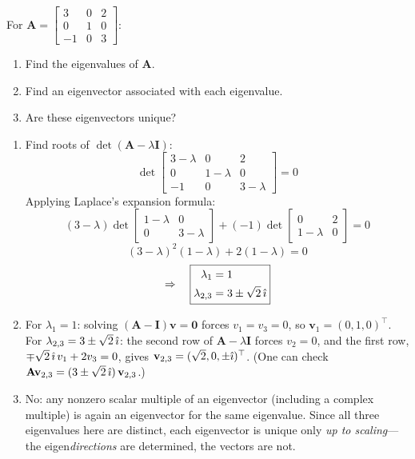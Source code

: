 \begin{exercise} %
    For $\mathbf{A} = \begin{bmatrix} 3 & 0 & 2 \\ 0 & 1 & 0 \\ -1 & 0 & 3 \end{bmatrix}$:
    \begin{enumerate}[label=(\alph*)]
        \item Find the eigenvalues of $\mathbf{A}$.
        \item Find an eigenvector associated with each eigenvalue.
        \item Are these eigenvectors unique?
    \end{enumerate}
\end{exercise}

\begin{solution}
    \begin{enumerate}[label=(\alph*)]
        \item
        Find roots of $\det (\mathbf{A} - \lambda \mathbf{I})$:
        \[
        \det\begin{bmatrix} 3-\lambda & 0 & 2 \\ 0 & 1-\lambda & 0 \\ -1 & 0 & 3-\lambda \end{bmatrix} = 0
        \]
        Applying Laplace's expansion formula:
        \[
        (3-\lambda)\det\begin{bmatrix} 1-\lambda & 0 \\ 0 & 3-\lambda \end{bmatrix} + (-1)\det\begin{bmatrix} 0 & 2 \\ 1-\lambda & 0 \end{bmatrix} = 0
        \]
        \[
        (3-\lambda)^2(1-\lambda) + 2(1-\lambda) = 0
        \]
        \[
            \Rightarrow \quad \boxed{
                \begin{aligned}
                    \lambda_1 &= 1\\
                    \lambda_{2,3} &= 3 \pm \sqrt{2}\,\hat{\imath}
                \end{aligned}
            }
        \]
        \item For $\lambda_1 = 1$: solving $(\mathbf{A} - \mathbf{I})\mathbf{v} = \mathbf{0}$ forces $v_1 = v_3 = 0$, so $\mathbf{v}_1 = (0, 1, 0)^\top$. For $\lambda_{2,3} = 3 \pm \sqrt{2}\,\hat{\imath}$: the second row of $\mathbf{A} - \lambda\mathbf{I}$ forces $v_2 = 0$, and the first row, $\mp\sqrt{2}\,\hat{\imath}\, v_1 + 2 v_3 = 0$, gives $\mathbf{v}_{2,3} = (\sqrt{2}, 0, \pm\hat{\imath})^\top$. (One can check $\mathbf{A}\mathbf{v}_{2,3} = (3 \pm \sqrt{2}\,\hat{\imath})\, \mathbf{v}_{2,3}$.)
        \item No: any nonzero scalar multiple of an eigenvector (including a complex multiple) is again an eigenvector for the same eigenvalue. Since all three eigenvalues here are distinct, each eigenvector is unique only \emph{up to scaling}---the eigen\emph{directions} are determined, the vectors are not.
    \end{enumerate}
\end{solution}


